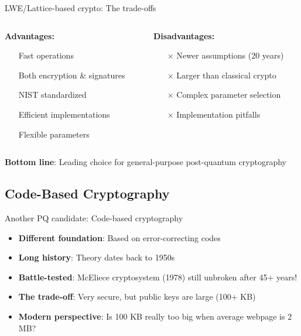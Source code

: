 \documentclass[aspectratio=169, lualatex, handout]{beamer}
\begin{document}
\begin{frame}{LWE/Lattice-based crypto: The trade-offs}
	\begin{columns}[c]
		\begin{column}{0.5\textwidth}
			\textbf{Advantages:}
			\begin{itemize}
				\item[\mycheckmark] Fast operations
				\item[\mycheckmark] Both encryption \& signatures
				\item[\mycheckmark] NIST standardized
				\item[\mycheckmark] Efficient implementations
				\item[\mycheckmark] Flexible parameters
			\end{itemize}
		\end{column}
		\begin{column}{0.5\textwidth}
			\textbf{Disadvantages:}
			\begin{itemize}
				\item[$\times$] Newer assumptions (20 years)
				\item[$\times$] Larger than classical crypto
				\item[$\times$] Complex parameter selection
				\item[$\times$] Implementation pitfalls
			\end{itemize}
		\end{column}
	\end{columns}
	\vspace{5mm}
	\begin{center}
		\textbf{Bottom line}: Leading choice for general-purpose post-quantum cryptography
	\end{center}
\end{frame}

\subsection{Code-Based Cryptography}

\begin{frame}{Another PQ candidate: Code-based cryptography}
	\begin{itemize}
		\item \textbf{Different foundation}: Based on error-correcting codes
		\item \textbf{Long history}: Theory dates back to 1950s
		\item \textbf{Battle-tested}: McEliece cryptosystem (1978) still unbroken after 45+ years!
		\item \textbf{The trade-off}: Very secure, but public keys are large (100+ KB)
		\item \textbf{Modern perspective}: Is 100 KB really too big when average webpage is 2 MB?
	\end{itemize}
\end{frame}
\end{document}
